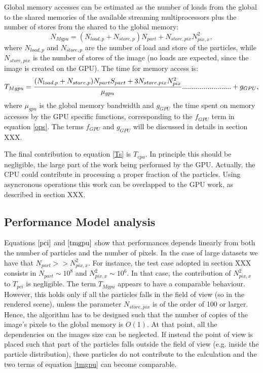\documentclass[11pt]{article}
\begin{document}
Global memory accesses can be estimated 
as the number of loads from the global to the shared memories of the available 
streaming multiprocessors plus the number of stores from the shared to the global memory: 
\begin{equation}
N_{Mgpu} = (N_{load,p} + N_{store,p}) N_{part} + N_{store,pix} N_{pix,x}^2,
\end{equation}
where $N_{load,p}$ and $N_{store,p}$ are the number of load and store of the 
particles, while $N_{store,pix}$ is the number of stores of the image (no loads 
are expected, since the image is created on the GPU). 
The time for memory access is:
\begin{equation}\label{tmgpu}
T_{Mgpu} = {(N_{load,p} + N_{store,p}) N_{part} S_{part} 
+ 3 N_{store,pix} N_{pix}^2\over \mu_{gpu}}.........................
+ g_{GPU},
\end{equation}
where $\mu_{gpu}$ is the global memory bandwidth and $g_{GPU}$ the time 
spent on memory accesses by the GPU specific
functions, corresponding to the $f_{GPU}$ term in equation \eqref{ops}.
The terms $f_{GPU}$ and $g_{GPU}$ will be discussed in details in section XXX.

The final contribution to equation \eqref{Ts} is $T_{cpu}$. In principle this should be negligible, 
the large part of the work being performed by the GPU. Actually, the CPU
could contribute in processing a proper fraction of the particles. Using
asyncronous operations this work can be overlapped 
to the GPU work, as described in section XXX.

\subsection{Performance Model analysis}


Equations $\eqref{pci}$ and $\eqref{tmgpu}$ show that performances
depends linearly from both the number of particles and the number of pixels. 
In the case of large datasets we have that
$N_{part} >> N_{pix,x}^2$. For instance, the test case adopted 
in section XXX consists in $N_{part} \sim 10^8$
and $N_{pix,x}^2 \sim 10^6$. 
In that case, the contribution of $N_{pix,x}^2$ 
to $T_{pci}$ is negligible. 
The term $T_{Mgpu}$ appears to have a comparable behaviour. However, 
this holds only if all the particles falls in the field of view (so in
the rendered scene),  unless the 
parameter $N_{store,pix}$ is of the order of 100 or larger. Hence, the algorithm has to
be designed such that the number of copies of the image's pixels to the 
global memory is $O(1)$. At that point, all the dependencies on the images size can
be neglected. If instead the point of view is placed such that part of the particles 
falls outside the field of view (e.g. inside the particle distribution), these 
particles do not contribute to the calculation and the two terms of equation 
\eqref{tmgpu} can become comparable.
\end{document}
